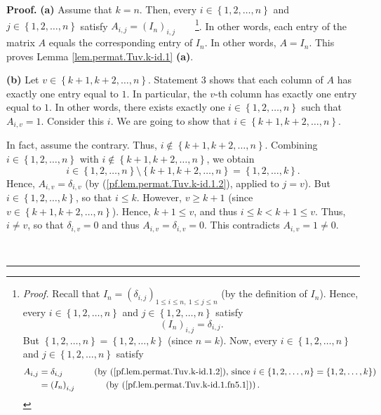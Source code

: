 \documentclass[numbers=enddot,12pt,final,onecolumn,notitlepage]{scrartcl}%
\theoremstyle{definition}
\newenvironment{proof}[1][Proof]{\noindent\textbf{#1.} }{\ \rule{0.5em}{0.5em}}
\begin{document}
\begin{proof}
\textbf{(a)} Assume that $k=n$. Then, every $i\in\left\{  1,2,\ldots
,n\right\}  $ and $j\in\left\{  1,2,\ldots,n\right\}  $ satisfy $A_{i,j}%
=\left(  I_{n}\right)  _{i,j}$\ \ \ \ \footnote{\textit{Proof.} Recall that
$I_{n}=\left(  \delta_{i,j}\right)  _{1\leq i\leq n,\ 1\leq j\leq n}$ (by the
definition of $I_{n}$). Hence, every $i\in\left\{  1,2,\ldots,n\right\}  $ and
$j\in\left\{  1,2,\ldots,n\right\}  $ satisfy%
\begin{equation}
\left(  I_{n}\right)  _{i,j}=\delta_{i,j}.
\label{pf.lem.permat.Tuv.k-id.1.fn5.1}%
\end{equation}
But $\left\{  1,2,\ldots,n\right\}  =\left\{  1,2,\ldots,k\right\}  $ (since
$n=k$). Now, every $i\in\left\{  1,2,\ldots,n\right\}  $ and $j\in\left\{
1,2,\ldots,n\right\}  $ satisfy%
\begin{align*}
A_{i,j}  &  =\delta_{i,j}\ \ \ \ \ \ \ \ \ \ \left(  \text{by
(\ref{pf.lem.permat.Tuv.k-id.1.2}), since }i\in\left\{  1,2,\ldots,n\right\}
=\left\{  1,2,\ldots,k\right\}  \right) \\
&  =\left(  I_{n}\right)  _{i,j}\ \ \ \ \ \ \ \ \ \ \left(  \text{by
(\ref{pf.lem.permat.Tuv.k-id.1.fn5.1})}\right)  .
\end{align*}
}. In other words, each entry of the matrix $A$ equals the corresponding entry
of $I_{n}$. In other words, $A=I_{n}$. This proves Lemma
\ref{lem.permat.Tuv.k-id.1} \textbf{(a)}.

\textbf{(b)} Let $v\in\left\{  k+1,k+2,\ldots,n\right\}  $. Statement 3 shows
that each column of $A$ has exactly one entry equal to $1$. In particular, the
$v$-th column has exactly one entry equal to $1$. In other words, there exists
exactly one $i\in\left\{  1,2,\ldots,n\right\}  $ such that $A_{i,v}=1$.
Consider this $i$. We are going to show that $i\in\left\{  k+1,k+2,\ldots
,n\right\}  $.

In fact, assume the contrary. Thus, $i\notin\left\{  k+1,k+2,\ldots,n\right\}
$. Combining $i\in\left\{  1,2,\ldots,n\right\}  $ with $i\notin\left\{
k+1,k+2,\ldots,n\right\}  $, we obtain%
\[
i\in\left\{  1,2,\ldots,n\right\}  \setminus\left\{  k+1,k+2,\ldots,n\right\}
=\left\{  1,2,\ldots,k\right\}  .
\]
Hence, $A_{i,v}=\delta_{i,v}$ (by (\ref{pf.lem.permat.Tuv.k-id.1.2}), applied
to $j=v$). But $i\in\left\{  1,2,\ldots,k\right\}  $, so that $i\leq k$.
However, $v\geq k+1$ (since $v\in\left\{  k+1,k+2,\ldots,n\right\}  $). Hence,
$k+1\leq v$, and thus $i\leq k<k+1\leq v$. Thus, $i\neq v$, so that
$\delta_{i,v}=0$ and thus $A_{i,v}=\delta_{i,v}=0$. This contradicts
$A_{i,v}=1\neq0$.


\end{proof}
\end{document}
